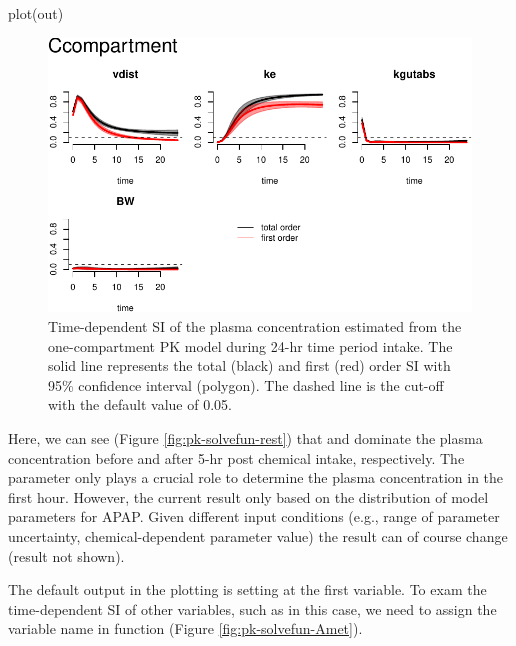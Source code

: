 \begin{Schunk}
\begin{Sinput}
plot(out)
\end{Sinput}
\begin{figure}

{\centering \includegraphics[width=0.8\linewidth]{RJ-pksensi_files/figure-latex/unnamed-chunk-11-1} 

}

\caption{\label{fig:pk-solvefun-rest}Time-dependent SI of the plasma concentration estimated from the one-compartment PK model during 24-hr time period intake. The solid line represents the total (black) and first (red) order SI with 95\% confidence interval (polygon). The dashed line is the cut-off with the default value of 0.05.}\label{fig:unnamed-chunk-11}
\end{figure}
\end{Schunk}

Here, we can see (Figure \ref{fig:pk-solvefun-rest}) that 
and  dominate the plasma concentration before and after 5-hr
post chemical intake, respectively. The parameter  only
plays a crucial role to determine the plasma concentration in the first
hour. However, the current result only based on the distribution of
model parameters for APAP. Given different input conditions (e.g., range
of parameter uncertainty, chemical-dependent parameter value) the result
can of course change (result not shown).

The default output in the plotting is setting at the first variable. To
exam the time-dependent SI of other variables, such as
 in this case, we need to assign the variable name
 in  function (Figure
\ref{fig:pk-solvefun-Amet}).

